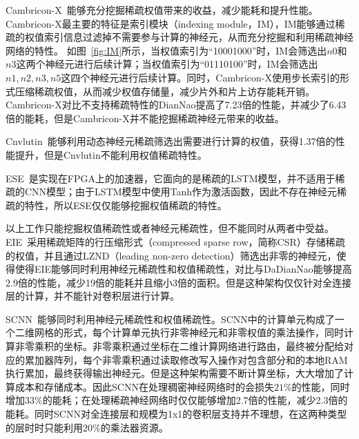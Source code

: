 Cambricon-X~\cite{zhang2016cambricon}能够充分挖掘稀疏权值带来的收益，减少能耗和提升性能。
Cambricon-X最主要的特征是索引模块（indexing module，IM），IM能够通过稀疏的权值索引信息过滤掉不需要参与计算的神经元，从而充分挖掘和利用稀疏神经网络的特性。
如图~\ref{fig:IM}所示，当权值索引为“10001000”时，IM会筛选出$n0$和$n3$这两个神经元进行后续计算；当权值索引为“01110100”时，IM会筛选出$n1, n2, n3, n5$这四个神经元进行后续计算。同时，Cambricon-X使用步长索引的形式压缩稀疏权值，从而减少权值存储量，减少片外和片上访存能耗开销。Cambricon-X对比不支持稀疏特性的DianNao提高了7.23倍的性能，并减少了6.43倍的能耗，但是Cambricon-X并不能挖掘稀疏神经元带来的收益。

Cnvlutin~\cite{albericio2016cnvlutin}能够利用动态神经元稀疏筛选出需要进行计算的权值，获得1.37倍的性能提升，但是Cnvlutin不能利用权值稀疏特性。

ESE~\cite{han2017ese}是实现在FPGA上的加速器，它面向的是稀疏的LSTM模型，并不适用于稀疏的CNN模型；由于LSTM模型中使用Tanh作为激活函数，因此不存在神经元稀疏的特性，所以ESE仅仅能够挖掘权值稀疏的特性。

以上工作只能挖掘权值稀疏性或者神经元稀疏性，但不能同时从两者中受益。EIE~\cite{han2016eie}采用稀疏矩阵的行压缩形式（compressed sparse row，简称CSR）存储稀疏的权值，并且通过LZND（leading non-zero detection）筛选出非零的神经元，使得使得EIE能够同时利用神经元稀疏性和权值稀疏性，对比与DaDianNao能够提高2.9倍的性能，减少19倍的能耗并且缩小3倍的面积。但是这种架构仅仅针对全连接层的计算，并不能针对卷积层进行计算。

SCNN~\cite{angshuman2017scnn}能够同时利用神经元稀疏性和权值稀疏性。SCNN中的计算单元构成了一个二维网格的形式，每个计算单元执行非零神经元和非零权值的乘法操作，同时计算非零乘积的坐标。非零乘积通过坐标在二维计算网络进行路由，最终被分配给对应的累加器阵列，每个非零乘积通过读取修改写入操作对包含部分和的本地RAM执行累加，最终获得输出神经元。但是这种架构需要不断计算坐标，大大增加了计算成本和存储成本。因此SCNN在处理稠密神经网络时的会损失$21\%$的性能，同时增加$33\%$的能耗；在处理稀疏神经网络时仅仅能够增加2.7倍的性能，减少2.3倍的能耗。同时SCNN对全连接层和规模为1x1的卷积层支持并不理想，在这两种类型的层时时只能利用$20\%$的乘法器资源。
 
